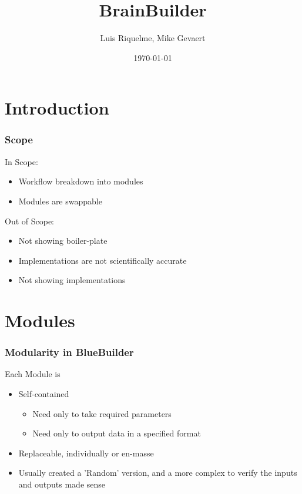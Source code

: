 \documentclass{beamer}
\title{BrainBuilder}
\author{Luis Riquelme, Mike Gevaert}
\institute{Human Brain Project}
\date{\today}
\begin{document}
\begin{frame}
  \titlepage
\end{frame}

\section{Introduction}
\begin{frame}
  \frametitle{Scope}
  In Scope:
  \begin{itemize}
     \item Workflow breakdown into modules
     \item Modules are swappable
  \end{itemize}

  Out of Scope:
  \begin{itemize}
     \item Not showing boiler-plate
     \item Implementations are not scientifically accurate
     \item Not showing implementations
  \end{itemize}
\end{frame}

\section{Modules}

\begin{frame}
  \frametitle{Modularity in BlueBuilder}
  Each Module is
  \begin{itemize}
    \item Self-contained
    \begin{itemize}
       \item Need only to take required parameters
       \item Need only to output data in a specified format
    \end{itemize}
    \item Replaceable, individually or en-masse
    \item Usually created a 'Random' version, and a more complex to verify the inputs and outputs made sense
  \end{itemize}
\end{frame}
\end{document}
